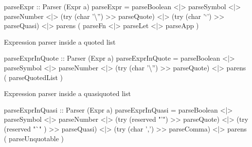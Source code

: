 \documentclass[]{article}
\newenvironment{Shaded}{}{}
\newcommand{\DataTypeTok}[1]{\textcolor[rgb]{0.56,0.13,0.00}{{#1}}}
\newcommand{\CharTok}[1]{\textcolor[rgb]{0.25,0.44,0.63}{{#1}}}
\newcommand{\StringTok}[1]{\textcolor[rgb]{0.25,0.44,0.63}{{#1}}}
\newcommand{\OtherTok}[1]{\textcolor[rgb]{0.00,0.44,0.13}{{#1}}}
\newcommand{\FunctionTok}[1]{\textcolor[rgb]{0.02,0.16,0.49}{{#1}}}
\newcommand{\NormalTok}[1]{{#1}}
\begin{document}
\begin{Shaded}
\begin{Highlighting}[]
\OtherTok{parseExpr ::} \DataTypeTok{Parser} \NormalTok{(}\DataTypeTok{Expr} \NormalTok{a)}
\NormalTok{parseExpr }\FunctionTok{=} \NormalTok{parseBoolean}
        \FunctionTok{<|>} \NormalTok{parseSymbol}
        \FunctionTok{<|>} \NormalTok{parseNumber}
        \FunctionTok{<|>} \NormalTok{(try (char }\CharTok{'\textbackslash{}''}\NormalTok{) }\FunctionTok{>>} \NormalTok{parseQuote)}
        \FunctionTok{<|>} \NormalTok{(try (char }\CharTok{'`'}\NormalTok{)  }\FunctionTok{>>} \NormalTok{parseQuasi)}
        \FunctionTok{<|>} \NormalTok{parens ( parseFn }\FunctionTok{<|>} \NormalTok{parseLet }\FunctionTok{<|>} \NormalTok{parseApp )}
\end{Highlighting}
\end{Shaded}

Expression parser inside a quoted list

\begin{Shaded}
\begin{Highlighting}[]
\OtherTok{parseExprInQuote ::} \DataTypeTok{Parser} \NormalTok{(}\DataTypeTok{Expr} \NormalTok{a)}
\NormalTok{parseExprInQuote }\FunctionTok{=} \NormalTok{parseBoolean}
               \FunctionTok{<|>} \NormalTok{parseSymbol}
               \FunctionTok{<|>} \NormalTok{parseNumber}
               \FunctionTok{<|>} \NormalTok{(try (char }\CharTok{'\textbackslash{}''}\NormalTok{) }\FunctionTok{>>} \NormalTok{parseQuote)}
               \FunctionTok{<|>} \NormalTok{parens ( parseQuotedList )}
\end{Highlighting}
\end{Shaded}

Expression parser inside a quasiquoted list

\begin{Shaded}
\begin{Highlighting}[]
\OtherTok{parseExprInQuasi ::} \DataTypeTok{Parser} \NormalTok{(}\DataTypeTok{Expr} \NormalTok{a)}
\NormalTok{parseExprInQuasi }\FunctionTok{=} \NormalTok{parseBoolean}
               \FunctionTok{<|>} \NormalTok{parseSymbol}
               \FunctionTok{<|>} \NormalTok{parseNumber}
               \FunctionTok{<|>} \NormalTok{(try (reserved }\StringTok{"'"}\NormalTok{) }\FunctionTok{>>}  \NormalTok{parseQuote)}
               \FunctionTok{<|>} \NormalTok{(try (reserved }\StringTok{"`"} \NormalTok{) }\FunctionTok{>>} \NormalTok{parseQuasi)}
               \FunctionTok{<|>} \NormalTok{(try (char }\CharTok{','}\NormalTok{)  }\FunctionTok{>>}     \NormalTok{parseComma)}
               \FunctionTok{<|>} \NormalTok{parens ( parseUnquotable )}
\end{Highlighting}
\end{Shaded}
\end{document}
